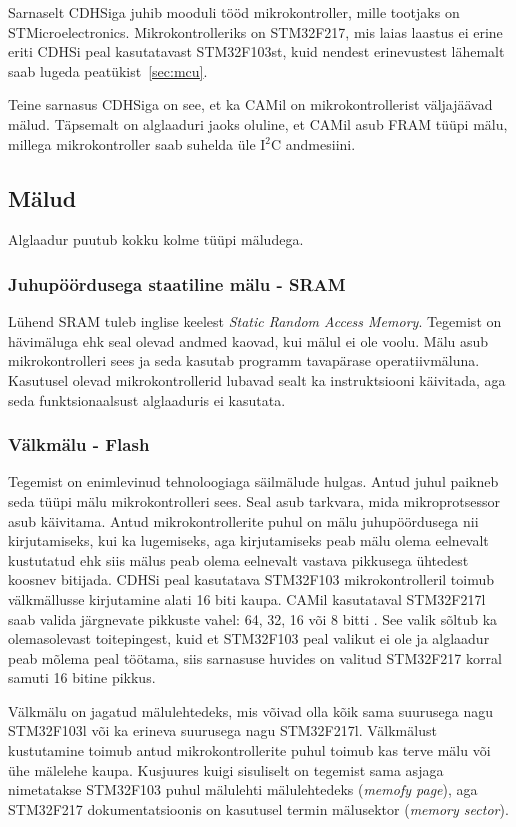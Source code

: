 \documentclass[12pt,a4paper]{article}
\newcommand{\iic}{I\({}^2\)C }
\begin{document}
Sarnaselt CDHSiga juhib mooduli tööd mikrokontroller, mille tootjaks on
STMicroelectronics. Mikrokontrolleriks on STM32F217, mis laias laastus ei erine
eriti CDHSi peal kasutatavast STM32F103st, kuid nendest erinevustest lähemalt
saab lugeda peatükist~\ref{sec:mcu}.

Teine sarnasus CDHSiga on see, et ka CAMil on mikrokontrollerist väljajäävad
mälud. Täpsemalt on alglaaduri jaoks oluline, et CAMil asub FRAM tüüpi mälu,
millega mikrokontroller saab suhelda üle \iic andmesiini.

\subsection{Mälud}
\label{sec:m2lud}
Alglaadur puutub kokku kolme tüüpi mäludega.

\subsubsection{Juhupöördusega staatiline mälu - SRAM}
Lühend SRAM tuleb inglise keelest \textit{Static Random Access Memory}. Tegemist
on hävimäluga ehk seal olevad andmed kaovad, kui mälul ei ole voolu. Mälu asub
mikrokontrolleri sees ja seda kasutab programm tavapärase operatiivmäluna.
Kasutusel olevad mikrokontrollerid lubavad sealt ka instruktsiooni käivitada,
aga seda funktsionaalsust alglaaduris ei kasutata.

\subsubsection{Välkmälu - Flash}
Tegemist on enimlevinud tehnoloogiaga säilmälude hulgas. Antud juhul paikneb
seda tüüpi mälu mikrokontrolleri sees. Seal asub tarkvara, mida mikroprotsessor
asub käivitama. Antud mikrokontrollerite puhul on mälu juhupöördusega nii
kirjutamiseks, kui ka lugemiseks, aga kirjutamiseks peab mälu olema eelnevalt
kustutatud ehk siis mälus peab olema eelnevalt vastava pikkusega ühtedest
koosnev bitijada. CDHSi peal kasutatava STM32F103 mikrokontrolleril toimub
välkmällusse kirjutamine alati 16 biti kaupa. CAMil kasutataval STM32F217l saab
valida järgnevate pikkuste vahel: 64, 32, 16 või 8 bitti \cite{f2fpm}. See valik
sõltub ka olemasolevast toitepingest, kuid et STM32F103 peal valikut ei ole ja
alglaadur peab mõlema peal töötama, siis sarnasuse huvides on valitud STM32F217
korral samuti 16 bitine pikkus.

Välkmälu on jagatud mälulehtedeks, mis võivad olla kõik sama suurusega nagu
STM32F103l või ka erineva suurusega nagu STM32F217l. Välkmälust kustutamine
toimub antud mikrokontrollerite puhul toimub kas terve mälu või ühe mälelehe
kaupa. Kusjuures kuigi sisuliselt on tegemist sama asjaga nimetatakse STM32F103
puhul mälulehti mälulehtedeks (\textit{memofy page}), aga STM32F217
dokumentatsioonis on kasutusel termin mälusektor (\textit{memory sector}).
\cite{f1fpm,f2fpm}
\end{document}
